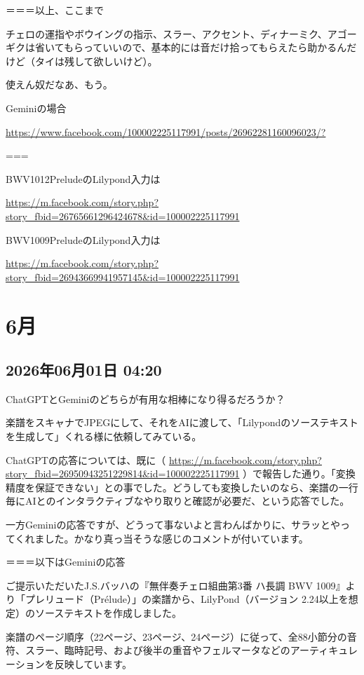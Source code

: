 ＝＝＝以上、ここまで

チェロの運指やボウイングの指示、スラー、アクセント、ディナーミク、アゴーギクは省いてもらっていいので、基本的には音だけ拾ってもらえたら助かるんだけど（タイは残して欲しいけど）。

使えん奴だなあ、もう。

Geminiの場合

\url{https://www.facebook.com/100002225117991/posts/26962281160096023/?}

===

BWV1012PreludeのLilypond入力は

\url{https://m.facebook.com/story.php?story_fbid=26765661296424678&id=100002225117991}

BWV1009PreludeのLilypond入力は

\url{https://m.facebook.com/story.php?story_fbid=26943669941957145&id=100002225117991}

\section{6月}

\subsection*{2026年06月01日 04:20}

ChatGPTとGeminiのどちらが有用な相棒になり得るだろうか？

楽譜をスキャナでJPEGにして、それをAIに渡して、「Lilypondのソーステキストを生成して」くれる様に依頼してみている。

ChatGPTの応答については、既に（ \url{https://m.facebook.com/story.php?story_fbid=26950943251229814&id=100002225117991} ）で報告した通り。「変換精度を保証できない」との事でした。どうしても変換したいのなら、楽譜の一行毎にAIとのインタラクティブなやり取りと確認が必要だ、という応答でした。

一方Geminiの応答ですが、どうって事ないよと言わんばかりに、サラッとやってくれました。かなり真っ当そうな感じのコメントが付いています。

＝＝＝以下はGeminiの応答

ご提示いただいたJ.S.バッハの『無伴奏チェロ組曲第3番 ハ長調 BWV 1009』より「プレリュード（Prélude）」の楽譜から、LilyPond（バージョン 2.24以上を想定）のソーステキストを作成しました。

楽譜のページ順序（22ページ、23ページ、24ページ）に従って、全88小節分の音符、スラー、臨時記号、および後半の重音やフェルマータなどのアーティキュレーションを反映しています。

